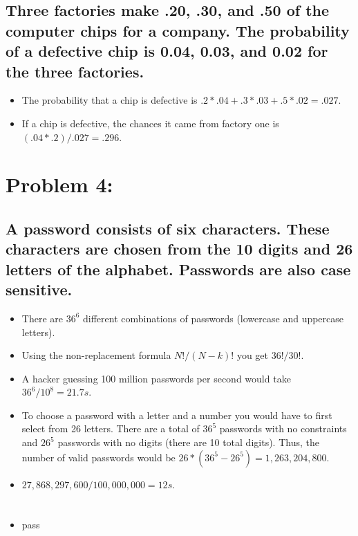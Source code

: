 \documentclass{article} %
\begin{document}
\subsection{Three factories make .20, .30, and .50 of the computer chips for a company. The
probability of a defective chip is 0.04, 0.03, and 0.02 for the three factories.}

\begin{itemize}
    \item The probability that a chip is defective is \(.2*.04 + .3*.03 + .5*.02 = .027\).
    \item If a chip is defective, the chances it came from factory one is \((.04*.2)/.027 = .296\).
\end{itemize}

\section{Problem 4:}
\subsection{A password consists of six characters. These characters are chosen from the 10 digits
and 26 letters of the alphabet. Passwords are also case sensitive.}
\begin{itemize}
    \item There are \(36^6\) different combinations of passwords (lowercase and uppercase letters).
    \item Using the non-replacement formula \(N!/(N-k)!\) you get \(36!/30!\).
    \item A hacker guessing 100 million passwords per second would take \(36^6/10^8 = 21.7s\).
    \item To choose a password with a letter and a number you would have to first select from 26 letters. There are a total of 
    \(36^5\) passwords with no constraints and \(26^5\) passwords with no digits (there are 10 total digits). Thus, the
    number of valid passwords would be \(26*(36^5-26^5) = 1,263,204,800\).
    \item \(27,868,297,600/100,000,000 = 12s\).

\end{itemize}

\section{}
\subsection{}
\begin{itemize}
    \item pass

\end{itemize}
\end{document}
